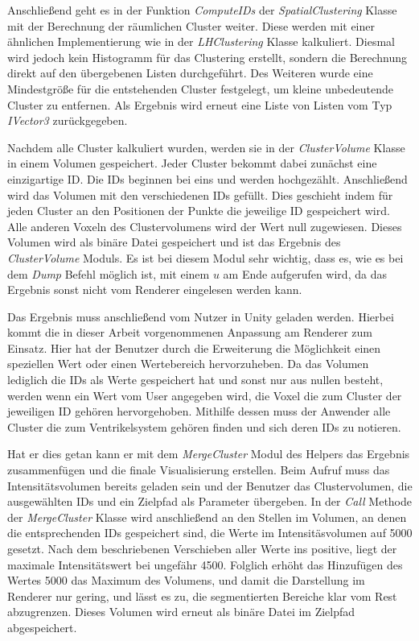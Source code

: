 Anschließend geht es in der Funktion \textit{ComputeIDs} der \textit{SpatialClustering} Klasse mit der Berechnung der räumlichen Cluster weiter. Diese werden mit einer ähnlichen Implementierung wie in der \textit{LHClustering} Klasse kalkuliert. Diesmal wird jedoch kein Histogramm für das Clustering erstellt, sondern die Berechnung direkt auf den übergebenen Listen durchgeführt. Des Weiteren wurde eine Mindestgröße für die entstehenden Cluster festgelegt, um kleine unbedeutende Cluster zu entfernen. Als Ergebnis wird erneut eine Liste von Listen vom Typ \textit{IVector3} zurückgegeben.


Nachdem alle Cluster kalkuliert wurden, werden sie in der \textit{ClusterVolume} Klasse in einem Volumen gespeichert. Jeder Cluster bekommt dabei zunächst eine einzigartige ID. Die IDs beginnen bei eins und werden hochgezählt. Anschließend wird das Volumen mit den verschiedenen IDs gefüllt. Dies geschieht indem für jeden Cluster an den Positionen der Punkte die jeweilige ID gespeichert wird. Alle anderen Voxeln des Clustervolumens wird der Wert null zugewiesen.
Dieses Volumen wird als binäre Datei gespeichert und ist das Ergebnis des \textit{ClusterVolume} Moduls. Es ist bei diesem Modul sehr wichtig, dass es, wie es bei dem \textit{Dump} Befehl möglich ist, mit einem $u$ am Ende aufgerufen wird, da das Ergebnis sonst nicht vom Renderer eingelesen werden kann.


Das Ergebnis muss anschließend vom Nutzer in Unity geladen werden. Hierbei kommt die in dieser Arbeit vorgenommenen Anpassung am Renderer zum Einsatz.
Hier hat der Benutzer durch die Erweiterung die Möglichkeit einen speziellen Wert oder einen Wertebereich hervorzuheben. Da das Volumen lediglich die IDs als Werte gespeichert hat und sonst nur aus nullen besteht, werden wenn ein Wert vom User angegeben wird, die Voxel die zum Cluster der jeweiligen ID gehören hervorgehoben.
Mithilfe dessen muss der Anwender alle Cluster die zum Ventrikelsystem gehören finden und sich deren IDs zu notieren.


Hat er dies getan kann er mit dem \textit{MergeCluster} Modul des Helpers das Ergebnis zusammenfügen und die finale Visualisierung erstellen. Beim Aufruf muss das Intensitätsvolumen bereits geladen sein und der Benutzer das Clustervolumen, die ausgewählten IDs und ein Zielpfad als Parameter übergeben. In der \textit{Call} Methode der \textit{MergeCluster} Klasse wird anschließend an den Stellen im Volumen, an denen die entsprechenden IDs gespeichert sind, die Werte im Intensitäsvolumen auf 5000 gesetzt.
Nach dem beschriebenen Verschieben aller Werte ins positive, liegt der maximale Intensitätswert bei ungefähr 4500. Folglich erhöht das Hinzufügen des Wertes 5000 das Maximum des Volumens, und damit die Darstellung im Renderer nur gering, und lässt es zu, die segmentierten Bereiche klar vom Rest abzugrenzen. Dieses Volumen wird erneut als binäre Datei im Zielpfad abgespeichert.


